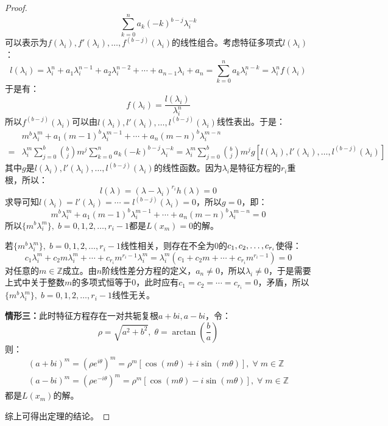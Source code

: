 \begin{proof}
\begin{equation*}
		\sum_{k=0}^{n}a_k(-k)^{b-j}\lambda_i^{-k}
	\end{equation*}
	可以表示为$f(\lambda_i),f'(\lambda_i),\dots,f^{(b-j)}(\lambda_i)$的线性组合。考虑特征多项式$l(\lambda_i)$：
	\begin{equation*}
		l(\lambda_i)=\lambda_i^n+a_1\lambda_i^{n-1}+a_2\lambda_i^{n-2}+\cdots+a_{n-1}\lambda_i+a_n=\sum_{k=0}^{n}a_k\lambda_i^{n-k}=\lambda_i^nf(\lambda_i)
	\end{equation*}
	于是有：
	\begin{equation*}
		f(\lambda_i)=\frac{l(\lambda_i)}{\lambda_i^n}
	\end{equation*}
	所以$f^{(b-j)}(\lambda_i)$可以由$l(\lambda_i),l'(\lambda_i),\dots,l^{(b-j)}(\lambda_i)$线性表出。于是：
	\begin{align*}
		&m^{b}\lambda_i^m+a_1(m-1)^{b}\lambda_i^{m-1}+\cdots+a_{n}(m-n)^{b}\lambda_i^{m-n} \\
		=&\lambda_i^m\sum_{j=0}^{b}\binom{b}{j}m^j\sum_{k=0}^{n}a_k(-k)^{b-j}\lambda_i^{-k}=\lambda_i^m\sum_{j=0}^{b}\binom{b}{j}m^jg[l(\lambda_i),l'(\lambda_i),\dots,l^{(b-j)}(\lambda_i)]
	\end{align*}
	其中$g$是$l(\lambda_i),l'(\lambda_i),\dots,l^{(b-j)}(\lambda_i)$的线性函数。因为$\lambda_i$是特征方程的$r_i$重根，所以：
	\begin{equation*}
		l(\lambda)=(\lambda-\lambda_i)^{r_i}h(\lambda)=0
	\end{equation*}
	求导可知$l(\lambda_i)=l'(\lambda_i)=\cdots=l^{(b-j)}(\lambda_i)=0$，所以$g=0$，即：
	\begin{equation*}
		m^{b}\lambda_i^m+a_1(m-1)^{b}\lambda_i^{m-1}+\cdots+a_{n}(m-n)^{b}\lambda_i^{m-n}=0
	\end{equation*}
	所以$\{m^b\lambda_i^m\},\;b=0,1,2,\dots,r_i-1$都是$L(x_m)=0$的解。\par
	若$\{m^b\lambda_i^m\},\;b=0,1,2,\dots,r_i-1$线性相关，则存在不全为$0$的$c_1, c_2, \dots, c_{r_i}$使得：
	\begin{equation*}
		c_1\lambda_i^m+c_2m\lambda_i^m+\cdots+c_{r_i}m^{r_i-1}\lambda_i^m=\lambda_i^m(c_1+c_2m+\cdots+c_{r_i}m^{r_i-1})=0
	\end{equation*}
	对任意的$m\in\mathbb{Z}$成立。由$n$阶线性差分方程的定义，$a_n\ne0$，所以$\lambda_i\ne0$，于是需要上式中关于整数$m$的多项式恒等于$0$，此时应有$c_1=c_2=\cdots=c_{r_i}=0$，矛盾，所以$\{m^b\lambda_i^m\},\;b=0,1,2,\dots,r_i-1$线性无关。\par
	\textbf{情形三：}此时特征方程存在一对共轭复根$a+bi,a-bi$，令：
	\begin{equation*}
		\rho=\sqrt{a^2+b^2},\;\theta=\arctan\left(\frac{b}{a}\right)
	\end{equation*}
	则：
	\begin{gather*}
		(a+bi)^m=(\rho e^{i\theta})^m=\rho^m[\cos(m\theta)+i\sin(m\theta)],\;\forall\;m\in\mathbb{Z} \\
		(a-bi)^m=(\rho e^{-i\theta})^m=\rho^m[\cos(m\theta)-i\sin(m\theta)],\;\forall\;m\in\mathbb{Z}
	\end{gather*}
	都是$L(x_m)$的解。\par
	综上可得出定理的结论。
\end{proof}
